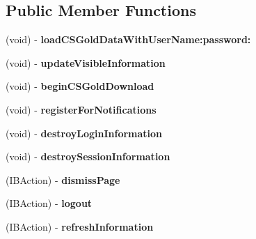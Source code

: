 \subsection*{Public Member Functions}
\begin{DoxyCompactItemize}
\item 
\hypertarget{interface_polar_points_acb450bd822ff6e36dcc1eceb8f5106ef}{
(void) -\/ {\bfseries loadCSGoldDataWithUserName:password:}}
\label{interface_polar_points_acb450bd822ff6e36dcc1eceb8f5106ef}

\item 
\hypertarget{interface_polar_points_aca1aa041c547be42da125f7882290816}{
(void) -\/ {\bfseries updateVisibleInformation}}
\label{interface_polar_points_aca1aa041c547be42da125f7882290816}

\item 
\hypertarget{interface_polar_points_aa45bdc57387c29ded5406b688e1daf9a}{
(void) -\/ {\bfseries beginCSGoldDownload}}
\label{interface_polar_points_aa45bdc57387c29ded5406b688e1daf9a}

\item 
\hypertarget{interface_polar_points_a466ac27494b91c340efe2d0ac05cd241}{
(void) -\/ {\bfseries registerForNotifications}}
\label{interface_polar_points_a466ac27494b91c340efe2d0ac05cd241}

\item 
\hypertarget{interface_polar_points_ad91916d30d1fb15bab5a74b6d2f2f553}{
(void) -\/ {\bfseries destroyLoginInformation}}
\label{interface_polar_points_ad91916d30d1fb15bab5a74b6d2f2f553}

\item 
\hypertarget{interface_polar_points_a86228f87c6f5749ed963a537da6c75e6}{
(void) -\/ {\bfseries destroySessionInformation}}
\label{interface_polar_points_a86228f87c6f5749ed963a537da6c75e6}

\item 
\hypertarget{interface_polar_points_acda03c9598e5a6269449482d5af3f980}{
(IBAction) -\/ {\bfseries dismissPage}}
\label{interface_polar_points_acda03c9598e5a6269449482d5af3f980}

\item 
\hypertarget{interface_polar_points_a9d66236831eb22fe98681d6e4bc1dc32}{
(IBAction) -\/ {\bfseries logout}}
\label{interface_polar_points_a9d66236831eb22fe98681d6e4bc1dc32}

\item 
\hypertarget{interface_polar_points_af0728e271d543f1c51d95cd5bd598b87}{
(IBAction) -\/ {\bfseries refreshInformation}}
\label{interface_polar_points_af0728e271d543f1c51d95cd5bd598b87}

\end{DoxyCompactItemize}

